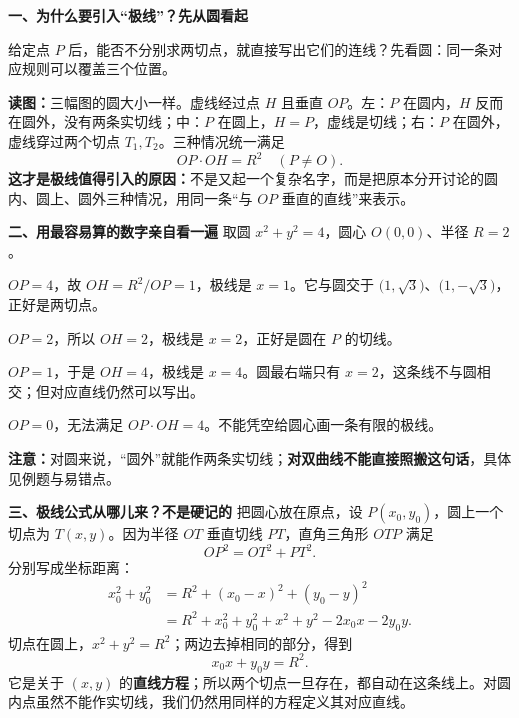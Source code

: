 \begin{explanationbox}
\textbf{\textcolor{CExplanation}{一、为什么要引入“极线”？先从圆看起}}

给定点 $P$ 后，能否不分别求两切点，就直接写出它们的连线？先看圆：同一条对应规则可以覆盖三个位置。

\medskip
\begin{center}

\end{center}
\noindent\textbf{读图：}三幅图的圆大小一样。虚线经过点 $H$ 且垂直 $OP$。左：$P$ 在圆内，$H$ 反而在圆外，没有两条实切线；中：$P$ 在圆上，$H=P$，虚线是切线；右：$P$ 在圆外，虚线穿过两个切点 $T_1,T_2$。三种情况统一满足
\[
OP\cdot OH=R^2\quad(P\ne O).
\]
\textbf{这才是极线值得引入的原因：}不是又起一个复杂名字，而是把原本分开讨论的圆内、圆上、圆外三种情况，用同一条“与 $OP$ 垂直的直线”来表示。

\medskip
\textbf{\textcolor{CExplanation}{二、用最容易算的数字亲自看一遍}}
取圆 $x^2+y^2=4$，圆心 $O(0,0)$、半径 $R=2$。
\begin{description}[style=nextline,leftmargin=2em,itemsep=0.35em]
\item[外点 $P(4,0)$：] $OP=4$，故 $OH=R^2/OP=1$，极线是 $x=1$。它与圆交于 $\bigl(1,\sqrt3\bigr)$、$\bigl(1,-\sqrt3\bigr)$，正好是两切点。
\item[圆上点 $P(2,0)$：] $OP=2$，所以 $OH=2$，极线是 $x=2$，正好是圆在 $P$ 的切线。
\item[内点 $P(1,0)$：] $OP=1$，于是 $OH=4$，极线是 $x=4$。圆最右端只有 $x=2$，这条线不与圆相交；但对应直线仍然可以写出。
\item[圆心 $P(0,0)$：] $OP=0$，无法满足 $OP\cdot OH=4$。不能凭空给圆心画一条有限的极线。
\end{description}
\textbf{注意：}对圆来说，“圆外”就能作两条实切线；\textbf{对双曲线不能直接照搬这句话}，具体见例题与易错点。

\medskip
\textbf{\textcolor{CExplanation}{三、极线公式从哪儿来？不是硬记的}}
把圆心放在原点，设 $P(x_0,y_0)$，圆上一个切点为 $T(x,y)$。因为半径 $OT$ 垂直切线 $PT$，直角三角形 $OTP$ 满足
\[
OP^2=OT^2+PT^2.
\]
分别写成坐标距离：
\[
\begin{aligned}
x_0^2+y_0^2&=R^2+(x_0-x)^2+(y_0-y)^2\\
&=R^2+x_0^2+y_0^2+x^2+y^2-2x_0x-2y_0y.
\end{aligned}
\]
切点在圆上，$x^2+y^2=R^2$；两边去掉相同的部分，得到
\[
\boxed{x_0x+y_0y=R^2.}
\]
它是关于 $(x,y)$ 的\textbf{直线方程}；所以两个切点一旦存在，都自动在这条线上。对圆内点虽然不能作实切线，我们仍然用同样的方程定义其对应直线。


\end{explanationbox}
